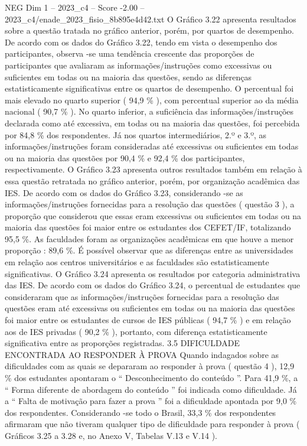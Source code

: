 \begin{textsample}{NEG Dim 1 – 2023\_c4 – Score -2.00 – 2023\_c4/enade\_2023\_fisio\_8b895e4d42.txt}
O Gráfico 3.22 apresenta resultados sobre a questão tratada no gráfico anterior, porém, por quartos de desempenho.
De acordo com os dados do Gráfico 3.22, tendo em vista o desempenho dos participantes, observa -se uma tendência crescente das proporções de participantes que avaliaram as informações/instruções como excessivas ou suficientes em todas ou na maioria das questões, sendo as diferenças estatisticamente significativas entre os quartos de desempenho.
O percentual foi mais elevado no quarto superior ( 94,9 \% ), com percentual superior ao da média nacional ( 90,7 \% ).
No quarto inferior, a suficiência das informações/instruções declarada como até excessiva, em todas ou na maioria das questões, foi percebida por 84,8 \% dos respondentes.
Já nos quartos intermediários, 2.º e 3.º, as informações/instruções foram consideradas até excessivas ou suficientes em todas ou na maioria das questões por 90,4 \% e 92,4 \% dos participantes, respectivamente.
O Gráfico 3.23 apresenta outros resultados também em relação à essa questão retratada no gráfico anterior, porém, por organização acadêmica das IES.
De acordo com os dados do Gráfico 3.23, considerando -se as informações/instruções fornecidas para a resolução das questões ( questão 3 ), a proporção que considerou que essas eram excessivas ou suficientes em todas ou na maioria das questões foi maior entre os estudantes dos CEFET/IF, totalizando 95,5 \%.
As faculdades foram as organizações acadêmicas em que houve a menor proporção : 89,6 \%.
É possível observar que as diferenças entre as universidades em relação aos centros universitários e as faculdades são estatisticamente significativas.
O Gráfico 3.24 apresenta os resultados por categoria administrativa das IES.
De acordo com os dados do Gráfico 3.24, o percentual de estudantes que consideraram que as informações/instruções fornecidas para a resolução das questões eram até excessivas ou suficientes em todas ou na maioria das questões foi maior entre os estudantes de cursos de IES públicas ( 94,7 \% ) e em relação aos de IES privadas ( 90,2 \% ), portanto, com diferença estatisticamente significativa entre as proporções registradas. 3.5 DIFICULDADE ENCONTRADA AO RESPONDER À PROVA Quando indagados sobre as dificuldades com as quais se depararam ao responder à prova ( questão 4 ), 12,9 \% dos estudantes apontaram o “ Desconhecimento do conteúdo ”.
Para 41,9 \%, a “ Forma diferente de abordagem do conteúdo ” foi indicada como dificuldade.
Já a “ Falta de motivação para fazer a prova ” foi a dificuldade apontada por 9,0 \% dos respondentes.
Considerando -se todo o Brasil, 33,3 \% dos respondentes afirmaram que não tiveram qualquer tipo de dificuldade para responder à prova ( Gráficos 3.25 a 3.28 e, no Anexo V, Tabelas V.13 e V.14 ).

\end{textsample}
